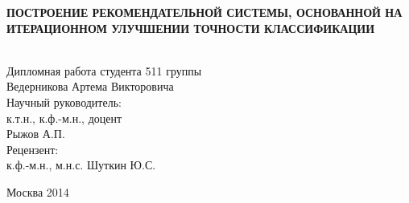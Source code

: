 \begin{titlepage}
\begin{figure}[htbp]
\begin{center}
\end{center}

\end{figure}


\begin{center}
{\LARGE \bf ПОСТРОЕНИЕ РЕКОМЕНДАТЕЛЬНОЙ СИСТЕМЫ, ОСНОВАННОЙ НА ИТЕРАЦИОННОМ УЛУЧШЕНИИ ТОЧНОСТИ КЛАССИФИКАЦИИ\\
}\\
\end{center}
\vfill


\bigskip
\begin{flushright}
Дипломная работа студента 511 группы\\
 Ведерникова Артема Викторовича\\
Научный руководитель:\\ к.т.н., к.ф.-м.н., доцент \\Рыжов А.П.\\
Рецензент: \\к.ф.-м.н., м.н.с. 
Шуткин Ю.С. 
\end{flushright}
\vfill \vfill \centerline{Москва 2014} \break
\end{titlepage}